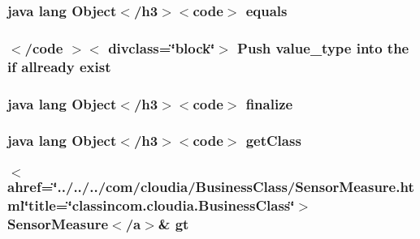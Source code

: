 \hypertarget{_cloudia_d_b_8html_a8974318cea585f72df717e0380ec7104}{
\subsubsection[{equals}]{\setlength{\rightskip}{0pt plus 5cm}java lang Object$<$/h3$>$$<$code$>$ equals}}\label{_cloudia_d_b_8html_a8974318cea585f72df717e0380ec7104}
\hypertarget{_cloudia_d_b_8html_a28694d6558e48780d64566a2daec14db}{
\subsubsection[{exist}]{$<$/code $>$$<$ divclass=\char`\"{}block\char`\"{}$>$ Push value\-\_\-type into the {\bf if} allready exist}}\label{_cloudia_d_b_8html_a28694d6558e48780d64566a2daec14db}
\hypertarget{_cloudia_d_b_8html_ab2315181ead4aeedef2374039b6ddde7}{
\subsubsection[{finalize}]{\setlength{\rightskip}{0pt plus 5cm}java lang Object$<$/h3$>$$<$code$>$ finalize}}\label{_cloudia_d_b_8html_ab2315181ead4aeedef2374039b6ddde7}
\hypertarget{_cloudia_d_b_8html_a98e6644727fe65eac217a6855045be43}{
\subsubsection[{get\-Class}]{\setlength{\rightskip}{0pt plus 5cm}java lang Object$<$/h3$>$$<$code$>$ get\-Class}}\label{_cloudia_d_b_8html_a98e6644727fe65eac217a6855045be43}
\hypertarget{_cloudia_d_b_8html_a7ee70caa890833ed68e0c07ad3b6ce0d}{
\subsubsection[{gt}]{\setlength{\rightskip}{0pt plus 5cm}$<$ahref=\char`\"{}../../../com/cloudia/Business\-Class/Sensor\-Measure.\-html\char`\"{}title=\char`\"{}classincom.\-cloudia.\-Business\-Class\char`\"{}$>$ Sensor\-Measure$<$/{\bf a}$>$\& gt}}\label{_cloudia_d_b_8html_a7ee70caa890833ed68e0c07ad3b6ce0d}
